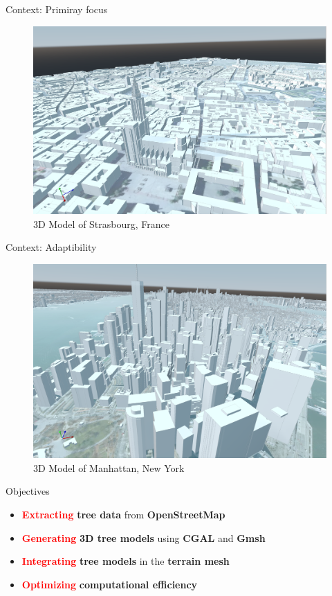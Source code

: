 \documentclass[10pt]{beamer}
\begin{document}
\begin{frame}{Context: Primiray focus}
	\begin{figure}
		\centering
		\includegraphics[width=\textwidth]{images/strasbourg-mesh-2.png}
		\caption{3D Model of Strasbourg, France}
		\label{fig:figure1}
	\end{figure}
\end{frame}

\begin{frame}{Context: Adaptibility}
	\begin{figure}
		\centering
		\includegraphics[width=\textwidth]{images/mesh-manhattan-2.png}
		\caption{3D Model of Manhattan, New York \cite{img:NY}}
		\label{fig:figure1}
	\end{figure}
\end{frame}

\begin{frame}{Objectives}
	\Large
	\begin{itemize}
		\item \textbf{\textcolor{red}{Extracting}} \textbf{tree data} from \textbf{OpenStreetMap}
		\item \textbf{\textcolor{red}{Generating}} \textbf{3D tree models} using \textbf{CGAL} and \textbf{Gmsh}
		\item \textbf{\textcolor{red}{Integrating}} \textbf{tree models} in the \textbf{terrain mesh}
		\item \textbf{\textcolor{red}{Optimizing}} \textbf{computational efficiency}
	\end{itemize}
\end{frame}
\end{document}
